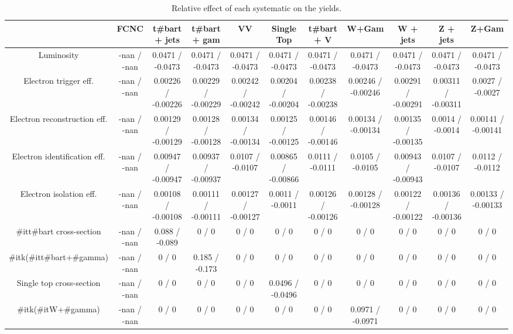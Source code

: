 \begin{table}[htbp]
\begin{center}
\footnotesize
\begin{tabular}{|c|c|c|c|c|c|c|c|c|c|c|}
\hline 
      & FCNC      & t#bar{t} + jets      & t#bar{t} +  gam      & VV      & Single Top      & t#bar{t} + V      & W+Gam      & W + jets      & Z + jets      & Z+Gam \\ 
\hline 
  Luminosity & -nan / -nan & 0.0471 / -0.0473 & 0.0471 / -0.0473 & 0.0471 / -0.0473 & 0.0471 / -0.0473 & 0.0471 / -0.0473 & 0.0471 / -0.0473 & 0.0471 / -0.0473 & 0.0471 / -0.0473 & 0.0471 / -0.0473 \\ 
  Electron trigger eff. & -nan / -nan & 0.00226 / -0.00226 & 0.00229 / -0.00229 & 0.00242 / -0.00242 & 0.00204 / -0.00204 & 0.00238 / -0.00238 & 0.00246 / -0.00246 & 0.00291 / -0.00291 & 0.00311 / -0.00311 & 0.0027 / -0.0027 \\ 
  Electron reconstruction eff. & -nan / -nan & 0.00129 / -0.00129 & 0.00128 / -0.00128 & 0.00134 / -0.00134 & 0.00125 / -0.00125 & 0.00146 / -0.00146 & 0.00134 / -0.00134 & 0.00135 / -0.00135 & 0.0014 / -0.0014 & 0.00141 / -0.00141 \\ 
  Electron identification eff. & -nan / -nan & 0.00947 / -0.00947 & 0.00937 / -0.00937 & 0.0107 / -0.0107 & 0.00865 / -0.00866 & 0.0111 / -0.0111 & 0.0105 / -0.0105 & 0.00943 / -0.00943 & 0.0107 / -0.0107 & 0.0112 / -0.0112 \\ 
  Electron isolation eff. & -nan / -nan & 0.00108 / -0.00108 & 0.00111 / -0.00111 & 0.00127 / -0.00127 & 0.0011 / -0.0011 & 0.00126 / -0.00126 & 0.00128 / -0.00128 & 0.00122 / -0.00122 & 0.00136 / -0.00136 & 0.00133 / -0.00133 \\ 
  #it{t#bar{t}} cross-section & -nan / -nan & 0.088 / -0.089 & 0 / 0 & 0 / 0 & 0 / 0 & 0 / 0 & 0 / 0 & 0 / 0 & 0 / 0 & 0 / 0 \\ 
  #it{k}(#it{t#bar{t}+#gamma}) & -nan / -nan & 0 / 0 & 0.185 / -0.173 & 0 / 0 & 0 / 0 & 0 / 0 & 0 / 0 & 0 / 0 & 0 / 0 & 0 / 0 \\ 
  Single top cross-section & -nan / -nan & 0 / 0 & 0 / 0 & 0 / 0 & 0.0496 / -0.0496 & 0 / 0 & 0 / 0 & 0 / 0 & 0 / 0 & 0 / 0 \\ 
  #it{k}(#it{W+#gamma}) & -nan / -nan & 0 / 0 & 0 / 0 & 0 / 0 & 0 / 0 & 0 / 0 & 0.0971 / -0.0971 & 0 / 0 & 0 / 0 & 0 / 0 \\ 
\hline 
\end{tabular} 
\caption{Relative effect of each systematic on the yields.} 
\end{center} 
\end{table} 
